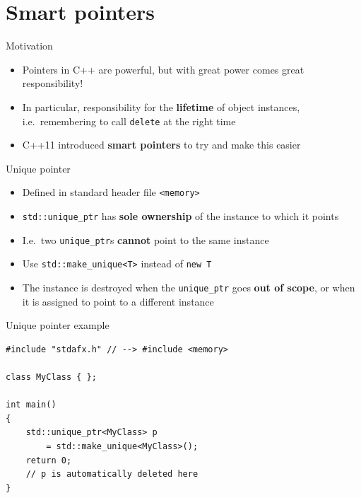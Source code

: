 \part{Smart pointers}
\frame{\partpage}

\begin{frame}{Motivation}
    \begin{itemize}
        \item Pointers in C++ are powerful, but with great power comes great responsibility! \pause
        \item In particular, responsibility for the \textbf{lifetime} of object instances,
            i.e.\ remembering to call \lstinline{delete} at the right time \pause
        \item C++11 introduced \textbf{smart pointers} to try and make this easier
    \end{itemize}
\end{frame}

\begin{frame}{Unique pointer}
    \begin{itemize}
        \item Defined in standard header file \lstinline{<memory>} \pause
        \item \lstinline{std::unique_ptr} has \textbf{sole ownership} of the instance to which it points \pause
        \item I.e.\ two \lstinline{unique_ptr}s \textbf{cannot} point to the same instance \pause
        \item Use \lstinline{std::make_unique<T>} instead of \lstinline{new T} \pause
        \item The instance is destroyed when the \lstinline{unique_ptr} goes \textbf{out of scope},
            or when it is assigned to point to a different instance
    \end{itemize}
\end{frame}

\begin{frame}[fragile]{Unique pointer example}
    \begin{lstlisting}
#include "stdafx.h" // --> #include <memory>

class MyClass { };

int main()
{
    std::unique_ptr<MyClass> p
        = std::make_unique<MyClass>();
    return 0;
    // p is automatically deleted here
}
    \end{lstlisting}
\end{frame}


